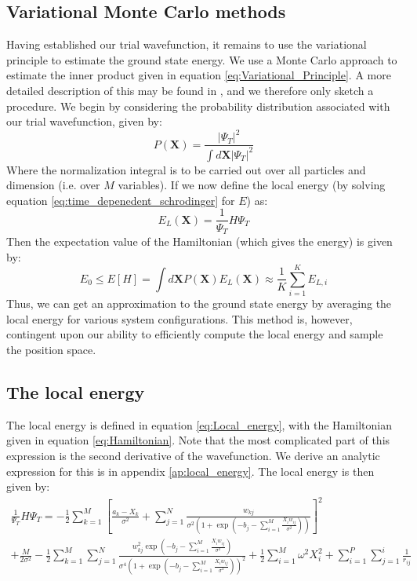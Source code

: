 \documentclass[a4paper, 10pt]{article}
\begin{document}
	\subsection{Variational Monte Carlo methods}
	Having established our trial wavefunction, it remains to use the variational principle to estimate the ground state energy. We use a Monte Carlo approach to estimate the inner product given in equation \ref{eq:Variational_Principle}. A more detailed description of this may be found in \cite{Hjorth-Jensen2015}, and we therefore only sketch a procedure. We begin by considering the probability distribution associated with our trial wavefunction, given by:
	\begin{equation}
	P(\mathbf{X})=\frac{|\Psi_T|^2}{\int d\mathbf{X}|\Psi_T|^2}
	\end{equation}
	Where the normalization integral is to be carried out over all particles and dimension (i.e. over $M$ variables). If we now define the local energy (by solving equation \ref{eq:time_depenedent_schrodinger} for $E$) as:
	\begin{equation}\label{eq:Local_energy}
	E_L(\mathbf{X})=\frac{1}{\Psi_T}H\Psi_T
	\end{equation}
	Then the expectation value of the Hamiltonian (which gives the energy) is given by:
	\begin{equation}\label{eq:energy_in_state_space}
	E_0 \leq E[H]=\int d\mathbf{X}P(\mathbf{X})E_L(\mathbf{X})\approx \frac{1}{K}\sum_{i=1}^{K}E_{L,i}
	\end{equation}
	Thus, we can get an approximation to the ground state energy by averaging the local energy for various system configurations. This method is, however, contingent upon our ability to efficiently compute the local energy and sample the position space.
	\subsection{The local energy}
	The local energy is defined in equation \ref{eq:Local_energy}, with the Hamiltonian given in equation \ref{eq:Hamiltonian}. Note that the most complicated part of this expression is the second derivative of the wavefunction. We derive an analytic expression for this is in appendix \ref{ap:local_energy}. The local energy is then given by:
	\begin{equation}
	\begin{split}
	\frac{1}{\Psi_T}H\Psi_T=-\frac{1}{2}\sum_{k=1}^M\left[\frac{a_k-X_k}{\sigma^2}+\sum_{j=1}^N \frac{w_{kj}}{\sigma^2 \left(1+ \exp \left(-b_j-\sum_{i=1}^{M} \frac{X_iw_{ij}}{\sigma^2}\right)\right)}\right]^2\\
	+\frac{M}{2\sigma^2}-\frac{1}{2}\sum_{k=1}^M\sum_{j=1}^N \frac{w_{kj}^2 \exp \left(-b_j-\sum_{i=1}^{M}\frac{X_iw_{ij}}{\sigma^2} \right)}{\sigma^4\left(1+ \exp \left(-b_j-\sum_{i=1}^{M} \frac{X_iw_{ij}}{\sigma^2}\right)\right)^2}+\frac{1}{2}\sum_{i=1}^M\omega^2 X_i^2+\sum_{i=1}^P \sum_{j=1}^i \frac{1}{r_{ij}}
	\end{split}
	\end{equation}
\end{document}
